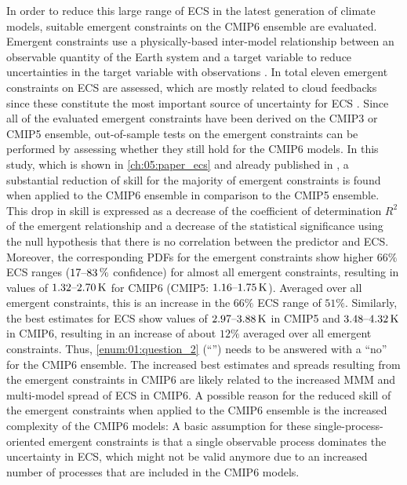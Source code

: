 In order to reduce this large range of \ac{ECS} in the latest generation of
climate  models, suitable emergent constraints on the \acs{CMIP}6 ensemble are
evaluated. Emergent constraints use a physically-based inter-model relationship
between an observable quantity of the Earth system and a target variable to
reduce uncertainties in the target variable with observations
\autocite{Allen2002}. In total eleven emergent constraints on \ac{ECS} are
assessed, which are mostly related to cloud feedbacks since these constitute
the most important source of uncertainty for \ac{ECS} \autocite{Boucher2013,
  Flato2013}. Since all of the evaluated emergent constraints have been derived
on the \acs{CMIP}3 or \acs{CMIP}5 ensemble, out-of-sample tests on the emergent
constraints can be performed by assessing whether they still hold for the
\acs{CMIP}6 models. In this study, which is shown in \cref{ch:05:paper_ecs} and
already published in \textcite{Schlund2020a}, a substantial reduction of skill
for the majority of emergent constraints is found when applied to the
\acs{CMIP}6 ensemble in comparison to the \acs{CMIP}5 ensemble. This drop in
skill is expressed as a decrease of the coefficient of determination $R^2$ of
the emergent relationship and a decrease of the statistical significance using
the null hypothesis that there is no correlation between the predictor and
\ac{ECS}. Moreover, the corresponding \acp{PDF} for the emergent constraints
show higher $66 \unit{\%}$ \ac{ECS} ranges ($\rangeunit{17}{83}{\%}$
confidence) for almost all emergent constraints, resulting in values of
$\rangeunit{1.32}{2.70}{K}$ for \acs{CMIP}6 (\acs{CMIP}5:
$\rangeunit{1.16}{1.75}{K}$). Averaged over all emergent constraints, this is
an increase in the $66 \unit{\%}$ \ac{ECS} range of $51 \unit{\%}$. Similarly,
the best estimates for \ac{ECS} show values of $\rangeunit{2.97}{3.88}{K}$ in
\acs{CMIP}5 and $\rangeunit{3.48}{4.32}{K}$ in \acs{CMIP}6, resulting in an
increase of about $12 \unit{\%}$ averaged over all emergent constraints. Thus,
\cref{enum:01:question_2} (\enquote{\emph{\KeyScienceQuestionTwo{}}}) needs to
be answered with a \enquote{no} for the \acs{CMIP}6 ensemble. The increased
best estimates and spreads resulting from the emergent constraints in
\acs{CMIP}6 are likely related to the increased \ac{MMM} and multi-model spread
of \ac{ECS} in \acs{CMIP}6. A possible reason for the reduced skill of the
emergent constraints when applied to the \acs{CMIP}6 ensemble is the increased
complexity of the \acs{CMIP}6 models: A basic assumption for these
single-process-oriented emergent constraints is that a single observable
process dominates the uncertainty in \ac{ECS}, which might not be valid anymore
due to an increased number of processes that are included in the \acs{CMIP}6
models.

